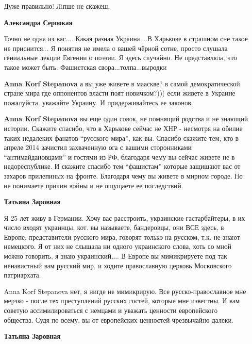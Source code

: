 \begin{itemize}
\begin{itemize}

Дуже правильно! Ліпше не скажеш.

\textbf{Александра Сероокая}

Точно не одна из вас....  Какая разная Украина....В Харькове в страшном сне
такое не приснится... Я понятия не имела о вашей чёрной сотне, просто слушала
гениальные лекции Евгении о поэзии. Я здесь случайно. Не представляла, что
такое может быть. Фашистская свора...толпа...выродки


\textbf{Anna Korf Stepanova} а вы уже живете в мааскве? в самой демократической
стране мира где оппонентов власти поят новичком?))) если живете в Украине
пожалуйста, уважайте Украину. И придерживайтесь ее законов.


\textbf{Anna Korf Stepanova} вы еще один совок, не помнящий родства и не знающий
истории. Скажите спасибо, что в Харькове сейчас не ХНР - несмотря на обилие
таких недалеких фанатов \enquote{русского мира}, как вы. Спасибо скажите тем, кто в
апреле 2014 зачистил захваченную ога с вашими сторонниками \enquote{антимайдановцами} и
гостями из РФ, благодаря чему вы сейчас живете не в недореспублике. И скажите
спасибо тем \enquote{фашистам} которые защищают вас от захаров прилепиных на
фронте. Благодаря чему вы живете в мирном городе. Но не понимаете причин войны и
не ощущаете ее последствий.

\textbf{Татьяна Заровная}

Я 25 лет живу в Германии. Хочу вас расстроить, украинские гастарбайтеры, в их
число входят украинцы, кот. вы называете, бандеровцы, они ВСЕ здесь, в Европе,
представители русского мира, говорят только на русском, т.к. не знают
немецкого. Я от них не слышала ни одного украинского слова, хоть со мной можно
говорить, я знаю украинский....  В Европе вы мимикрируете под так ненавистный
вам русский мир, и ходите православную церковь Московского патриархата.


Anna Korf Stepanova нет, я нигде не мимикрирую. Все русско-православное мне
мерзко - после тех преступлений русских гостей, которые мне известны. И вам
советую ассимилироваться с немцами и уважать ценности европейского общества.
Судя по всему, вы от европейских ценностей чрезвычайно далеки.

\textbf{Татьяна Заровная}


\end{itemize}
\end{itemize}
